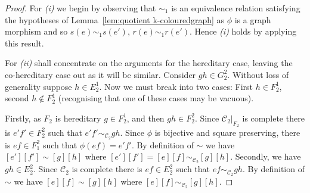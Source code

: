 \documentclass[12pt]{amsart}
\theoremstyle{definition}
\theoremstyle{remark}
\numberwithin{equation}{section}
\newcommand{\Cc}{\mathcal{C}}
\begin{document}
\begin{proof}
For \emph{(i)} we begin by observing that $\sim_1$ is an equivalence relation satisfying the hypotheses of Lemma~\ref{lem:quotient k-colouredgraph} as $\phi$ is a graph morphism and so  $s(e) \sim_1 s(e')$, $r(e) \sim_1 r(e')$. Hence \emph{(i)} holds by applying this result.

For \emph{(ii)} shall concentrate on the arguments for the hereditary case, leaving the co-hereditary case out as it will be similar. Consider $gh \in G_2^2$. Without loss of generality suppose $h \in E_2^1$. Now we must break into two cases: First $h \in F_2^1$, second $h \not \in F_2^1$ (recognising that one of these cases may be vacuous). 

Firstly, as $F_2$ is hereditary $g \in F_2^1$, and then $gh \in F_2^2$.
Since $\Cc_2 |_{F_2}$ is complete there is $e'f' \in F_2^2$ such that $e'f' \sim_{\Cc_2} gh$. Since $\phi$ is bijective and square preserving, there is $ef \in F_1^2$ such that $\phi (ef)=e'f'$. By definition of $\sim$ we have $[e'][f'] \sim [g][h]$ where $[e'][f'] = [e][f] \sim_{\Cc_2} [g][h]$. Secondly, we have $gh \in E_2^2$.
Since $\Cc_2$ is complete there is $ef \in E_2^2$ such that $ef \sim_{\Cc_2} gh$. By definition of $\sim$ we have $[e][f] \sim [g][h]$ where $[e][f] \sim_{\Cc_2} [g][h]$.
\end{proof}
\end{document}

